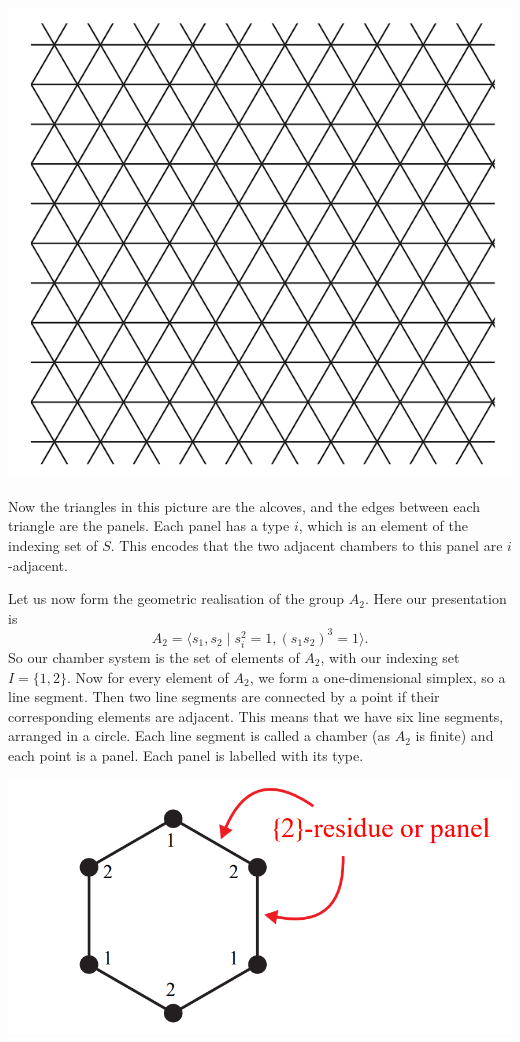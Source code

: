 \documentclass[11pt]{article}
\begin{document}
\begin{center}
    \includegraphics[scale=0.5]{Screenshot 2023-03-28 114008.png}\\
\end{center}

Now the triangles in this picture are the alcoves, and the edges between each triangle are the panels. Each panel has a type $i$, which is an element of the indexing set of $S$. This encodes that the two adjacent chambers to this panel are $i$-adjacent. 


Let us now form the geometric realisation of the group $A_2$. Here our presentation is 
\[A_2=\langle s_1,s_2\mid s_i^2=1, (s_1s_2)^3=1\rangle.\]
So our chamber system is the set of elements of $A_2$, with our indexing set $I=\{1,2\}$. Now for every element of $A_2$, we form a one-dimensional simplex, so a line segment. Then two line segments are connected by a point if their corresponding elements are adjacent. This means that we have six line segments, arranged in a circle. Each line segment is called a chamber (as $A_2$ is finite) and each point is a panel. Each panel is labelled with its type.

\begin{center}
    \includegraphics[scale=0.5]{Screenshot 2023-03-21 135437.png}\\
\end{center}
\end{document}
